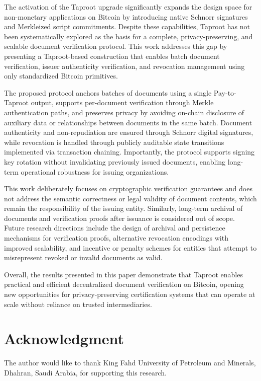 \documentclass{ieeeaccess}
\begin{document}
The activation of the Taproot upgrade significantly expands the design space for non-monetary applications on Bitcoin by introducing native Schnorr signatures and Merkleized script commitments.
Despite these capabilities, Taproot has not been systematically explored as the basis for a complete, privacy-preserving, and scalable document verification protocol.
This work addresses this gap by presenting a Taproot-based construction that enables batch document verification, issuer authenticity verification, and revocation management using only standardized Bitcoin primitives.

The proposed protocol anchors batches of documents using a single Pay-to-Taproot output, supports per-document verification through Merkle authentication paths, and preserves privacy by avoiding on-chain disclosure of auxiliary data or relationships between documents in the same batch.
Document authenticity and non-repudiation are ensured through Schnorr digital signatures, while revocation is handled through publicly auditable state transitions implemented via transaction chaining.
Importantly, the protocol supports signing key rotation without invalidating previously issued documents, enabling long-term operational robustness for issuing organizations.

This work deliberately focuses on cryptographic verification guarantees and does not address the semantic correctness or legal validity of document contents, which remain the responsibility of the issuing entity.
Similarly, long-term archival of documents and verification proofs after issuance is considered out of scope.
Future research directions include the design of archival and persistence mechanisms for verification proofs, alternative revocation encodings with improved scalability, and incentive or penalty schemes for entities that attempt to misrepresent revoked or invalid documents as valid.

Overall, the results presented in this paper demonstrate that Taproot enables practical and efficient decentralized document verification on Bitcoin, opening new opportunities for privacy-preserving certification systems that can operate at scale without reliance on trusted intermediaries.


\section*{Acknowledgment}
The author would like to thank King Fahd University of Petroleum and Minerals, Dhahran, Saudi Arabia, for supporting this research. 
\end{document}
